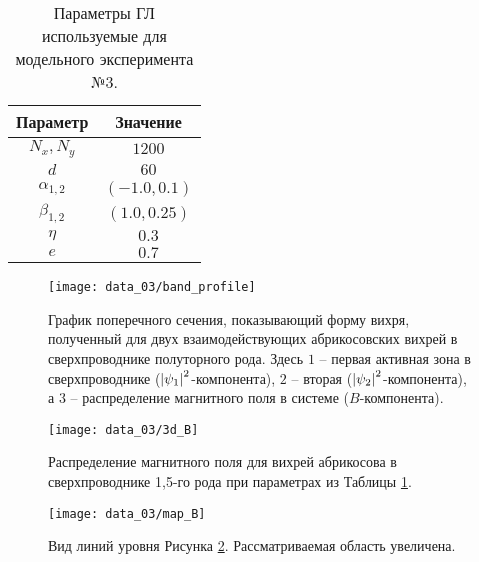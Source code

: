\clearpage


\begin{table}[h!]
    \centering
    \begin{tabular}{|c|c|}
        \hline 
        Параметр           & Значение              \\ \hline
        \( N_x, N_y \)     & \( 1200 \)            \\ \hline
        \( d \)            & \( 60 \)              \\ \hline
        \( \alpha_{1,2} \) & \( (-1.0, 0.1) \)     \\ \hline
        \( \beta_{1,2} \)  & \( (1.0, 0.25) \)     \\ \hline
        \( \eta \)         & \( 0.3 \)             \\ \hline
        \( e \)            & \( 0.7 \)             \\ \hline
    \end{tabular}
    \caption{Параметры ГЛ используемые для модельного эксперимента №3.}
    \label{param:03}
\end{table}

\begin{figure}[h!]
    \center
    \texttt{[image: data\_03/band\_profile]}
    \caption{График поперечного сечения, показывающий форму вихря, полученный 
        для двух взаимодействующих абрикосовских вихрей в сверхпроводнике 
        полуторного рода. Здесь \( 1 \) -- первая активная зона в 
        сверхпроводнике (\( \left| \psi_1 \right|^2 \)-компонента), \( 2 \) -- вторая 
        (\( \left| \psi_2 \right|^2 \)-компонента), а \( 3 \) -- распределение 
        магнитного поля в системе (\( B \)-компонента).}
    \label{img:band-profile-03}
\end{figure}

\begin{figure}[h!]
    \center
    \texttt{[image: data\_03/3d\_B]}
    \caption{Распределение магнитного поля для вихрей абрикосова в 
        сверхпроводнике 1,5-го рода при параметрах из Таблицы \ref{param:03}.}
    \label{img:3d-field-B-03}
\end{figure}

\begin{figure}[h!]
    \center
    \texttt{[image: data\_03/map\_B]}
    \caption{Вид линий уровня Рисунка \ref{img:3d-field-B-03}. 
        Рассматриваемая область увеличена.}
    \label{img:map-field-B-03}
\end{figure}

